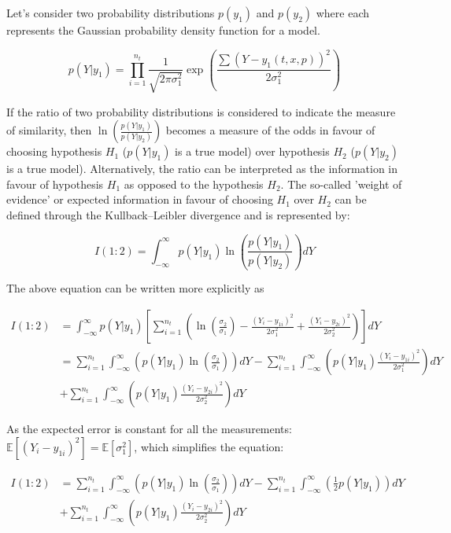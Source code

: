 \documentclass[../Article_Design_of_Experiment.tex]{subfiles}
\begin{document}
			
	Let's consider two probability distributions $p(y_1)$ and $p(y_2)$ where each represents the Gaussian probability density function for a model.
	
	{\footnotesize
	\begin{equation}
		p(Y|y_1) = \prod_{i=1}^{n_t} \frac{1}{\sqrt{2\pi\sigma_1^2}} \exp \left( \frac{\sum \left(Y - y_1(t,x,p)\right)^2}{2\sigma_1^2} \right)
	\end{equation}}
	
	If the ratio of two probability distributions is considered to indicate the measure of similarity, then $\ln \left(\frac{p(Y|y_1)}{p(Y|y_2)}\right)$ becomes a measure of the odds in favour of choosing hypothesis $H_1$ ($p(Y|y_1)$ is a true model) over hypothesis $H_2$ ($p(Y|y_2)$ is a true model). Alternatively, the ratio can be interpreted as the information in favour of hypothesis $H_1$ as opposed to the hypothesis $H_2$. The so-called 'weight of evidence' or expected information in favour of choosing $H_1$ over $H_2$ can be defined through the Kullback–Leibler divergence and is represented by:
	
	{\footnotesize
	\begin{equation}
		I(1:2) = \int_{-\infty}^{\infty} p(Y|y_1) \ln \left(\frac{p(Y|y_1)}{p(Y|y_2)}\right) dY 
	\end{equation}}
	
	The above equation can be written more explicitly as
	
	{\footnotesize
	\begin{align}
		I(1:2) &= \int_{-\infty}^{\infty} p(Y|y_1) \left[ \sum_{i=1}^{n_t} \left( \ln\left( \frac{\sigma_2}{\sigma_1} \right) - \frac{(Y_i - y_{1i})^2}{2\sigma_1^2} + \frac{(Y_i - y_{2i})^2}{2\sigma_2^2}\right) \right] dY \nonumber \\
		&= \sum_{i=1}^{n_t} \int_{-\infty}^{\infty} \left( p(Y|y_1) \ln\left(\frac{\sigma_2}{\sigma_1}\right) \right) dY - \sum_{i=1}^{n_t} \int_{-\infty}^{\infty} \left( p(Y|y_1) \frac{(Y_i-y_{1i})^2}{2\sigma_1^2} \right) dY \nonumber \\ 
		&+ \sum_{i=1}^{n_t} \int_{-\infty}^{\infty} \left( p(Y|y_1) \frac{(Y_i-y_{2i})^2}{2\sigma_2^2}  \right) dY
	\end{align}}
	
	As the expected error is constant for all the measurements: $\mathbb{E}[(Y_i-y_{1i})^2]=\mathbb{E}[\sigma_1^2]$, which simplifies the equation:
	
	{\footnotesize
	\begin{align}
		I(1:2) &= \sum_{i=1}^{n_t} \int_{-\infty}^{\infty} \left( p(Y|y_1) \ln \left(\frac{\sigma_2}{\sigma_1} \right) \right) dY - \sum_{i=1}^{n_t} \int_{-\infty}^{\infty} \left( \frac{1}{2} p(Y|y_1) \right) dY \nonumber \\ 
		&+ \sum_{i=1}^{n_t} \int_{-\infty}^{\infty} \left( p(Y|y_1) \frac{(Y_i-y_{2i})^2}{2\sigma_2^2}  \right) dY
	\end{align} }
	
\end{document}
